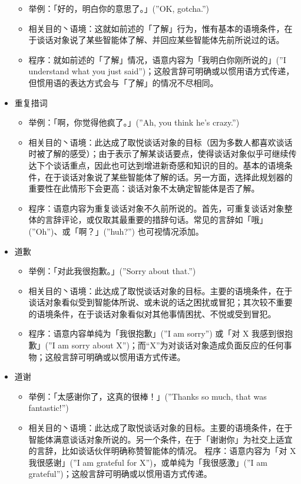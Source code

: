 \begin{itemize}
\begin {itemize}
\item 举例：「好的，明白你的意思了。」(”OK, gotcha.”)
\item 相关目的丶语境：这就如前述的「了解」行为，惟有基本的语境条件，在于谈话对象说了某些智能体了解、并回应某些智能体先前所说过的话。 
\item 程序：就如前述的「了解」情况，语意内容为「我明白你刚所说的」(”I understand what you just said”)；这般言辞可明确或以惯用语方式传递，但惯用语的表达方式会与「了解」的情况不尽相同。
\end{itemize}
\item 重复措词
\begin{itemize}
\item 举例：「啊，你觉得他疯了。」(”Ah, you think he’s crazy.”)
\item 相关目的丶语境：此达成了取悦谈话对象的目标（因为多数人都喜欢谈话时被了解的感受）；由于表示了解某谈话要点，使得谈话对象似乎可继续传达下个谈话重点，因此也可达到增进新奇感和知识的目的。基本的语境条件，在于谈话对象说了某些智能体了解的话。另一方面，选择此规划器的重要性在此情形下会更高：谈话对象不太确定智能体是否了解。
\item 程序：语意内容为重复谈话对象不久前所说的。首先，可重复谈话对象整体的言辞评论，或仅取其最重要的措辞句话。常见的言辞如「哦」(”Oh”)、或「啊？」(”huh?”) 也可视情况添加。
\end{itemize}
\item 道歉
\begin{itemize}
\item 举例：「对此我很抱歉。」(”Sorry about that.”)
\item 相关目的丶语境：此达成了取悦谈话对象的目标。主要的语境条件，在于谈话对象看似受到智能体所说、或未说的话之困扰或冒犯；其次较不重要的语境条件，在于谈话对象看似对其他事情困扰、不悦或受到冒犯。 
\item 程序：语意内容单纯为「我很抱歉」(”I am sorry”) 或「对 X 我感到很抱歉」(”I am sorry about X”)；而“X”为对谈话对象造成负面反应的任何事物；这般言辞可明确或以惯用语方式传递。
\end{itemize}
\item 道谢
\begin{itemize}
\item 举例：「太感谢你了，这真的很棒！」(”Thanks so much, that was fantastic!”)
\item 相关目的丶语境：此达成了取悦谈话对象的目标。主要的语境条件，在于智能体满意谈话对象所说的。另一个条件，在于「谢谢你」为社交上适宜的言辞，比如谈话伙伴明确称赞智能体的情况。
程序：语意内容为「对 X 我很感谢」(”I am grateful for X”)，或单纯为「我很感激」(”I am grateful”)；这般言辞可明确或以惯用语方式传递。

\end{itemize}
\end{itemize}
